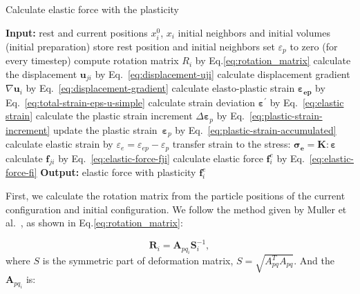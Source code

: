 \documentclass[10pt,journal,compsoc]{IEEEtran}
\begin{document}
\begin{algorithm}
	\begin{algorithmic}[1]
		\caption{Calculate elastic force with the plasticity}\label{alg:elasticity}
		\Statex \textbf{Input:} rest and current positions $x_i^0$, $x_i$
		\State initial neighbors and initial volumes
		\State (initial preparation)
		\State store rest position and initial neighbors
		\State set $\varepsilon_p$ to zero
		\EndFor
		\State
		\State (for every timestep)
		 
		\State compute rotation matrix $R_i$ by Eq.\ref{eq:rotation_matrix}
		\EndFor
		 
		\State calculate the displacement $\mathbf{u}_{ji}$ by Eq.~\ref{eq:displacement-uji}
		\EndFor
		\State calculate displacement gradient $\nabla \mathbf{u}_i$ by Eq.~\ref{eq:displacement-gradient}
		\State calculate elasto-plastic strain $\mathbf{{ \varepsilon_{ep}}}$  by Eq.~\ref{eq:total-strain-eps-u-simple}
		\State calculate strain deviation $\mathbf{\varepsilon}^{\prime}$ by Eq.~\ref{eq:elastic strain}
		  
		\State calculate the plastic strain increment $\Delta \mathbf{\varepsilon}_p$ by Eq.~\ref{eq:plastic-strain-increment}
		\State update the plastic strain~$\mathbf{\varepsilon}_p$ by Eq.~\ref{eq:plastic-strain-accumulated}
		\EndIf
		\State calculate elastic strain by $\varepsilon_e = { \varepsilon_{ep}} - \varepsilon_p$
		\State transfer strain to the stress: $\mathbf{\sigma_e} = \mathbf{K}: \mathbf{\varepsilon} $
		\EndFor
		 
		\State calculate $\mathbf{f}_{j i}$ by Eq.~\ref{eq:elastic-force-fji}
		\EndFor
		\State calculate elastic force $\mathbf{f}_{i}^e$ by Eq.~\ref{eq:elastic-force-fi}
		\EndFor
		\Statex \textbf{Output:} elastic force with plasticity $\mathbf{f}_{i}^e$
	\end{algorithmic}
\end{algorithm}


First, we calculate the rotation matrix from the particle positions of the current configuration and initial configuration. We follow the method given by Muller et al.~\cite{Muller2005-ShapeMatching}, as shown in Eq.\ref{eq:rotation_matrix}:

\begin{equation}
	\mathbf{R}_i=\mathbf{A}_{p q_i} \mathbf{S}_i^{-1}\label{eq:rotation_matrix},
\end{equation}
where $S$ is the symmetric part of deformation matrix, $S=\sqrt{A^T_{pq} A_{pq}}$. And the $\mathbf{A}_{p q_i}$ is:
\end{document}
